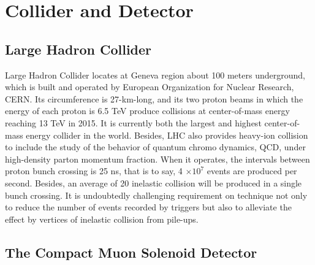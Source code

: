 
\chapter{Collider and Detector} \label{chap:2}

\section{Large Hadron Collider}%
Large Hadron Collider locates at Geneva region about 100 meters underground, which is built and operated by European Organization for Nuclear Research, CERN. 
Its circumference is 27-km-long, and its two proton beams in which the energy of each proton is 6.5 TeV produce collisions at center-of-mass energy reaching 13 TeV in 2015. 
It is currently both the largest and highest center-of-mass energy collider in the world.
Besides, LHC also provides heavy-ion collision to include the study of the behavior of quantum chromo dynamics, QCD, under high-density parton momentum fraction. 
When it operates, the intervals between proton bunch crossing is 25 ns, that is to say,  4 $\times 10^7$ events are produced per second. 
Besides, an average of 20 inelastic collision will be produced in a single bunch crossing.
It is undoubtedly challenging requirement on technique not only to reduce the number of events recorded by triggers but also to alleviate the effect by vertices of inelastic collision from pile-ups.

\section{The Compact Muon Solenoid Detector}

